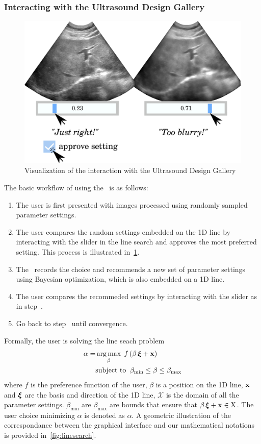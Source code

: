 \subsubsection{Interacting with the Ultrasound Design Gallery}
%
\begin{figure}[t]
  \centering
  \includegraphics[scale=0.25]{figures/ui_interaction.pdf}
  \caption{Visualization of the interaction with the Ultrasound Design Gallery}\label{fig:interaction}
\end{figure}
%
The basic workflow of using the \usdg~is as follows:
\begin{enumerate}
\item[\ding{182}] The user is first presented with images processed using randomly sampled parameter settings.
\item[\ding{183}] The user compares the random settings embedded on the 1D line by interacting with the slider in the line search and approves the most preferred setting. This process is illustrated in~\cref{fig:interaction}.
\item[\ding{184}] The \usdg~records the choice and recommends a new set of parameter settings using Bayesian optimization, which is also embedded on a 1D line.
\item[\ding{185}] The user compares the recommeded settings by interacting with the slider as in step~.
\item[\ding{186}] Go back to step~ until convergence.
\end{enumerate}

Formally, the user is solving the line seach problem
\begin{align}
 \alpha = &\operatorname*{arg\,max}_{ \beta }\; f\,(\beta\,\bm{\xi} + \mathbf{x}) \\
 &\text{subject to}\;\; \beta_{\mathrm{min}} \leq \beta \leq \beta_{\mathrm{max}}
\end{align}
where \(f\) is the preference function of the user, \(\beta\) is a position on the 1D line, \(\mathbf{x}\) and \(\bm{\xi}\) are the basis and direction of the 1D line, \(\mathcal{X}\) is the domain of all the parameter settings.
\(\beta_{\mathrm{min}}\) are \(\beta_{\mathrm{max}}\) are bounds that ensure that \(\beta\,\bm{\xi} + \mathbf{x}  \in \mathrm{X}\).
The user choice minimizing \(\alpha\) is denoted as \(\alpha\).
A geometric illustration of the correspondance between the graphical interface and our mathematical notations is provided in~\cref{fig:linesearch}.

